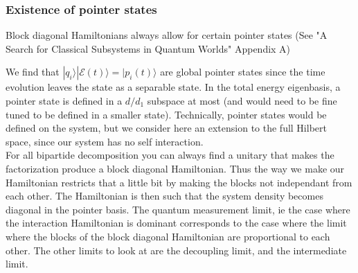 \documentclass{article}
\begin{document}
\subsubsection{Existence of pointer states}
Block diagonal Hamiltonians always allow for certain pointer states (See "A Search for Classical Subsystems in Quantum Worlds" Appendix A)\\

\begin{comment}
(Question, could we find one who's entanglement is not zero, but stays constant??? is it the case for a superposition of pointer states here? pointer stats on diff qi's??)
Thinking about it, that would be a state such that the off diagonal terms are non-zero and dont really vary in time.
or a state that cant be written as a separable pure state (ie superposition of 2 such state for ex) but where the relative weights of the 2 separable states stay the same. I think we can essentially express entanglement as a function of the relative weight of the 2 Schmidt states. if one dominates, then low entanglement, if they share weights pretty well then high entrop.
\end{comment}

We find that $|q_i\rangle|\mathcal{E}(t)\rangle = |p_i(t)\rangle$ are global pointer states since the time evolution leaves the state as a separable state. In the total energy eigenbasis, a pointer state is defined in a $d/d_1$ subspace at most (and would need to be fine tuned to be defined in a smaller state). Technically, pointer states would be defined on the system, but we consider here an extension to the full Hilbert space, since our system has no self interaction.\\

For all bipartide decomposition you can always find a unitary that makes the factorization produce a block diagonal Hamiltonian. Thus the way we make our Hamiltonian restricts that a little bit by making the blocks not independant from each other. The Hamiltonian is then such that the system density becomes diagonal in the pointer basis. The quantum measurement limit, ie the case where the interaction Hamiltonian is dominant corresponds to the case where the limit where the blocks of the block diagonal Hamiltonian are proportional to each other. The other limits to look at are the decoupling limit, and the intermediate limit.\\
\end{document}
